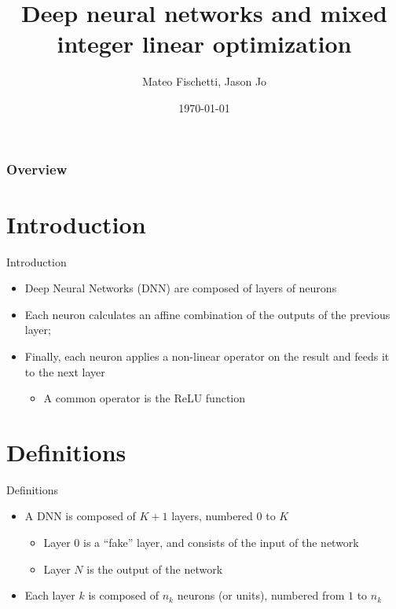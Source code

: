 \documentclass{beamer}
\title[DNN and MILP]{Deep neural networks and mixed integer linear optimization}
\author{Mateo Fischetti, Jason Jo}
\date{\today}
\begin{document}
\begin{frame}
\titlepage
\end{frame}

\begin{frame}
\frametitle{Overview}
\tableofcontents
\end{frame}

\section{Introduction}
\begin{frame}{Introduction}
  \begin{itemize}
  \item Deep Neural Networks (DNN) are composed of layers of neurons
  \item Each neuron calculates an affine combination of the outputs of the previous layer;
  \item Finally, each neuron applies a non-linear operator on the result and feeds it to the next layer
    \begin{itemize}
    \item A common operator is the ReLU function
    \end{itemize}
  \end{itemize}
\end{frame}

\section{Definitions}
\begin{frame}{Definitions}
  \begin{itemize}
  \item A DNN is composed of $K+1$ layers, numbered $0$ to $K$
    \begin{itemize}
    \item Layer $0$ is a ``fake'' layer, and consists of the input of the network
    \item Layer $N$ is the output of the network
    \end{itemize}
  \item Each layer $k$ is composed of $n_k$ neurons (or units), numbered from $1$ to $n_k$
  \end{itemize}
\end{frame}
\end{document}
